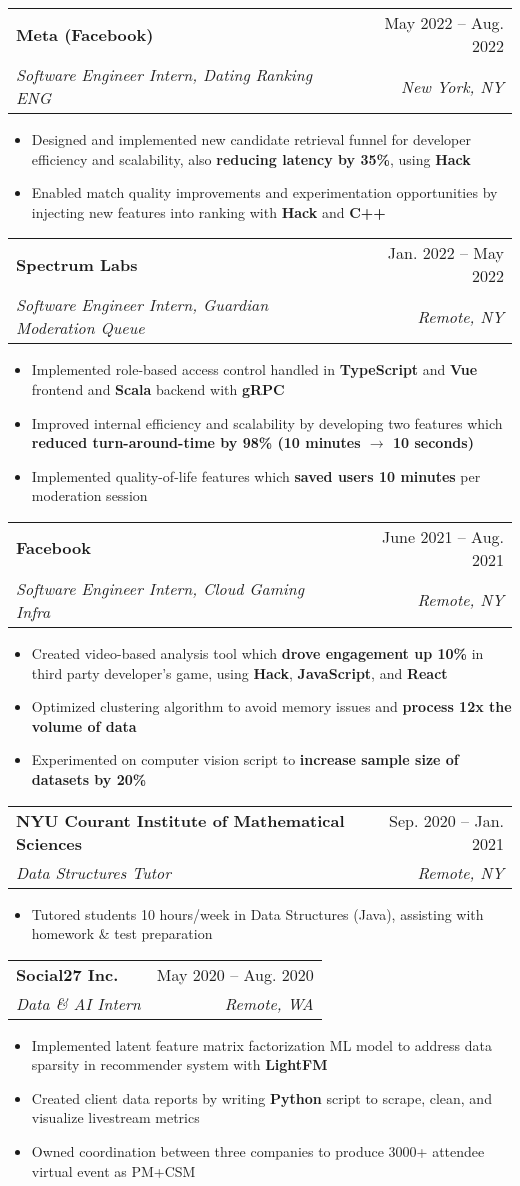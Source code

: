 \documentclass[letterpaper,11pt]{article}
\makeatletter
\newcommand{\resumeItem}[1]{
  \item\small{
    {#1 \vspace{-2pt}}
  }
}
\newcommand{\resumeSubheading}[4]{
  \vspace{-2pt}\item
    \begin{tabular*}{0.97\textwidth}[t]{l@{\extracolsep{\fill}}r}
      \textbf{#1} & #2 \\
      \textit{\small#3} & \textit{\small #4} \\
    \end{tabular*}\vspace{-7pt}
}
\newcommand{\resumeItemListStart}{\begin{itemize}}
\newcommand{\resumeItemListEnd}{\end{itemize}\vspace{-5pt}}
\makeatother
\begin{document}
    \resumeSubheading
      {Meta (Facebook)}{May 2022 -- Aug. 2022}
      {Software Engineer Intern, Dating Ranking ENG}{New York, NY}
      \resumeItemListStart
        \resumeItem{Designed and implemented new candidate retrieval funnel for developer efficiency and scalability, also \textbf{reducing latency by 35\%}, using \textbf{Hack}}
        \resumeItem{Enabled match quality improvements and experimentation opportunities by injecting new features into ranking with \textbf{Hack} and \textbf{C++}}
    \resumeItemListEnd

    \resumeSubheading
      {Spectrum Labs}{Jan. 2022 -- May 2022}
      {Software Engineer Intern, Guardian Moderation Queue}{Remote, NY}
      \resumeItemListStart
        \resumeItem{Implemented role-based access control handled in \textbf{TypeScript} and \textbf{Vue} frontend and \textbf{Scala} backend with \textbf{gRPC}}
        \resumeItem{Improved internal efficiency and scalability by developing two features which \textbf{reduced turn-around-time by 98\% (10 minutes $\rightarrow$ 10 seconds)}}
        \resumeItem{Implemented quality-of-life features which \textbf{saved users 10 minutes} per moderation session}
      \resumeItemListEnd

    \resumeSubheading
      {Facebook}{June 2021 -- Aug. 2021}
      {Software Engineer Intern, Cloud Gaming Infra}{Remote, NY}
      \resumeItemListStart
        \resumeItem{Created video-based analysis tool which \textbf{drove engagement up 10\%} in third party developer's game, using \textbf{Hack}, \textbf{JavaScript}, and \textbf{React}}
        \resumeItem{Optimized clustering algorithm to avoid memory issues and \textbf{process 12x the volume of data}}
        \resumeItem{Experimented on computer vision script to \textbf{increase sample size of datasets by 20\%}}
      \resumeItemListEnd

    \resumeSubheading
      {NYU Courant Institute of Mathematical Sciences}{Sep. 2020 -- Jan. 2021}
      {Data Structures Tutor}{Remote, NY}
      \resumeItemListStart
        \resumeItem{Tutored students 10 hours/week in Data Structures (Java), assisting with homework \& test preparation}
      \resumeItemListEnd

    \resumeSubheading
      {Social27 Inc.}{May 2020 -- Aug. 2020}
      {Data \& AI Intern}{Remote, WA}
      \resumeItemListStart
        \resumeItem{Implemented latent feature matrix factorization ML model to address data sparsity in recommender system with \textbf{LightFM}}
        \resumeItem{Created client data reports by writing \textbf{Python} script to scrape, clean, and visualize livestream metrics}
        \resumeItem{Owned coordination between three companies to produce 3000+ attendee virtual event as PM+CSM}
      \resumeItemListEnd
\end{document}
